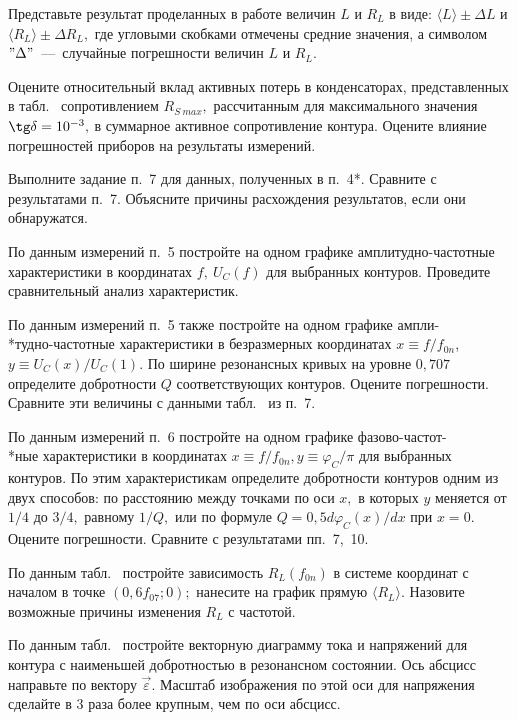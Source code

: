 \begin{lab:task}
		Представьте результат проделанных в работе  величин $L$ и $R_L$ в виде: $\langle
L\rangle\pm\Delta L$ и $\langle R_L\rangle\pm\Delta R_L,$ где угловыми скобками
отмечены средние значения, а символом $"\Delta"$~---~случайные погрешности
величин $L$ и $R_L.$

		Оцените относительный вклад активных потерь в конденсаторах,
представленных в табл.~ сопротивлением $R_{S~{max}},$ рассчитанным
для максимального значения $\tg\delta=10^{-3},$ в суммарное активное
сопротивление контура. Оцените влияние погрешностей приборов на результаты
измерений.

    \item * Выполните задание п.~7 для
данных, полученных в п.~4*. Сравните с результатами п.~7. Объясните причины
расхождения результатов, если они обнаружатся.

    \item По данным измерений п.~5 постройте на одном графике
амплитудно-частотные характеристики в координатах $ f,~U_C(f)$ для выбранных
контуров. Проведите сравнительный анализ характеристик.

    \item По данным измерений п.~5 также постройте на одном графике
ампли-\\*тудно-частотные характеристики в безразмерных координатах $x\equiv
f/f_{0n}$, $y\equiv U_C(x)/U_C(1)$. По ширине резонансных кривых на уровне
$0,707$ определите добротности $Q$ соответствующих контуров. Оцените
погрешности. Сравните эти величины с данными табл.~ из п.~7.

    \item По данным измерений п.~6 постройте на одном графике
фазово-частот-\\*ные характеристики в координатах $x\equiv f/f_{0n},
y\equiv\varphi_C/\pi$ для выбранных контуров. По этим характеристикам определите
добротности контуров одним из двух способов: по расстоянию между точками по оси
$x,$ в которых $y$ меняется от $1/4$ до $3/4,$ равному $1/Q,$ или по формуле
$Q=0,5d\varphi_C(x)/dx$ при $x=0.$ Оцените погрешности. Сравните с результатами
пп.~7,~10.

    \item По данным табл.~ постройте зависимость $R_L(f_{0n})$ в
системе координат с началом в точке $(0,6f_{07};0);$ нанесите на график прямую
$\langle R_L\rangle.$ Назовите возможные причины изменения $R_L$ с частотой.

    \item По данным табл.~ постройте векторную диаграмму тока и
напряжений для контура с наименьшей добротностью в резонансном состоянии. Ось
абсцисс направьте по вектору $\vec \varepsilon.$ Масштаб изображения по этой оси
для напряжения сделайте в 3 раза более крупным, чем по оси абсцисс.

\end{lab:task}


